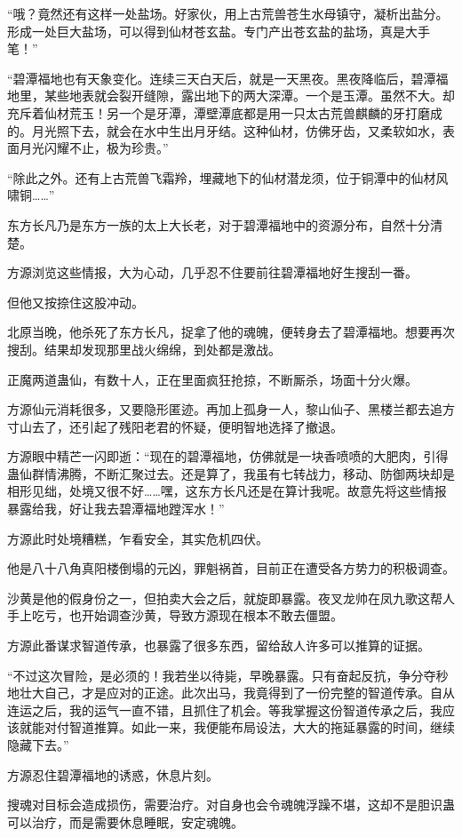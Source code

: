 \begin{this_body}
“哦？竟然还有这样一处盐场。好家伙，用上古荒兽苍生水母镇守，凝析出盐分。形成一处巨大盐场，可以得到仙材苍玄盐。专门产出苍玄盐的盐场，真是大手笔！”

“碧潭福地也有天象变化。连续三天白天后，就是一天黑夜。黑夜降临后，碧潭福地里，某些地表就会裂开缝隙，露出地下的两大深潭。一个是玉潭。虽然不大。却充斥着仙材荒玉！另一个是牙潭，潭壁潭底都是用一只太古荒兽麒麟的牙打磨成的。月光照下去，就会在水中生出月牙结。这种仙材，仿佛牙齿，又柔软如水，表面月光闪耀不止，极为珍贵。”

“除此之外。还有上古荒兽飞霜羚，埋藏地下的仙材潜龙须，位于铜潭中的仙材风啸铜……”

东方长凡乃是东方一族的太上大长老，对于碧潭福地中的资源分布，自然十分清楚。

方源浏览这些情报，大为心动，几乎忍不住要前往碧潭福地好生搜刮一番。

但他又按捺住这股冲动。

北原当晚，他杀死了东方长凡，捉拿了他的魂魄，便转身去了碧潭福地。想要再次搜刮。结果却发现那里战火绵绵，到处都是激战。

正魔两道蛊仙，有数十人，正在里面疯狂抢掠，不断厮杀，场面十分火爆。

方源仙元消耗很多，又要隐形匿迹。再加上孤身一人，黎山仙子、黑楼兰都去追方寸山去了，还引起了残阳老君的怀疑，便明智地选择了撤退。

方源眼中精芒一闪即逝：“现在的碧潭福地，仿佛就是一块香喷喷的大肥肉，引得蛊仙群情沸腾，不断汇聚过去。还是算了，我虽有七转战力，移动、防御两块却是相形见绌，处境又很不好……嘿，这东方长凡还是在算计我呢。故意先将这些情报暴露给我，好让我去碧潭福地蹚浑水！”

方源此时处境糟糕，乍看安全，其实危机四伏。

他是八十八角真阳楼倒塌的元凶，罪魁祸首，目前正在遭受各方势力的积极调查。

沙黄是他的假身份之一，但拍卖大会之后，就旋即暴露。夜叉龙帅在凤九歌这帮人手上吃亏，也开始调查沙黄，导致方源现在根本不敢去僵盟。

方源此番谋求智道传承，也暴露了很多东西，留给敌人许多可以推算的证据。

“不过这次冒险，是必须的！我若坐以待毙，早晚暴露。只有奋起反抗，争分夺秒地壮大自己，才是应对的正途。此次出马，我竟得到了一份完整的智道传承。自从连运之后，我的运气一直不错，且抓住了机会。等我掌握这份智道传承之后，我应该就能对付智道推算。如此一来，我便能布局设法，大大的拖延暴露的时间，继续隐藏下去。”

方源忍住碧潭福地的诱惑，休息片刻。

搜魂对目标会造成损伤，需要治疗。对自身也会令魂魄浮躁不堪，这却不是胆识蛊可以治疗，而是需要休息睡眠，安定魂魄。


\end{this_body}

